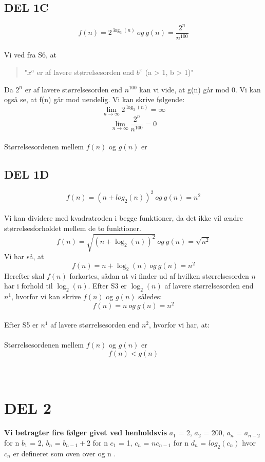 \documentclass[a4paper]{article}
\begin{document}
\bigskip
\subsection{DEL 1C}
\[ f(n) = 2^{\log_3(n)} \ og \ g(n) = \frac{2^n}{n^{100}} \] \\
%
Vi ved fra S6, at 
\begin{quotation}
"$x^a$ er af lavere størrelsesorden end $b^x$ (a > 1, b > 1)" \\
\end{quotation}
Da $2^n$ er af lavere størrelsesorden end $n^{100}$ kan vi vide, at
g(n) går mod 0. Vi kan også se, at f(n) går mod uendelig. Vi kan skrive følgende:  
\[ \lim_{n \to \infty} 2^{\log_3(n)} = \infty \]
\[ \lim_{n \to \infty} \frac{2^n}{n^{100}} = 0 \] \\
Størrelsesordenen mellem $f(n)$ og $g(n)$ er \\
\bigskip
\subsection{DEL 1D}

\[ f(n) = (n + log_2(n))^2 \ og \ g(n) = n^2 \] \\
% 

Vi kan dividere med kvadratroden i begge funktioner, da det ikke
vil ændre størrelsesforholdet mellem de to funktioner.
\[ f(n) = \sqrt{(n + \log_2(n))^2} \ og \ g(n) = \sqrt{n^2} \]
Vi har så, at 
\[ f(n) = n + \log_2(n) \ og \ g(n) = n^2 \]
Herefter skal $f(n)$ forkortes, sådan at vi finder ud af hvilken
størrelsesorden $n$ har i forhold til $\log_2(n)$. 
Efter S3 er $\log_2(n)$ af lavere størrelsesorden end $n^1$, hvorfor vi kan 
skrive $f(n)$ og $g(n)$ således:
\[ f(n) = n \ og \ g(n) = n^2 \] \\
Efter S5 er $n^1$ af lavere størrelsesorden end $n^2$, hvorfor vi har, at: \\ \\
%
Størrelsesordenen mellem $f(n)$ og $g(n)$ er 
\[ f(n) < g(n) \] \\ \\
%






\newpage
\section{DEL 2}

%
%
{\bfseries Vi betragter fire følger givet ved henholdsvis}
\newline $a_{1}$ = 2, $a_{2}$ = 200, $a_{n}$ = $a_{n-2}$ for n 
\newline $b_{1}$ = 2, $b_{n}$ = $b_{n-1}+2$ for n 
\newline $c_{1}$ = 1, $c_{n}$ = $nc_{n-1}$ for n 
\newline $d_{n}$ = $log_{2}(c_{n})$ hvor $c_{n}$ er defineret som oven over og n . 
\end{document}
